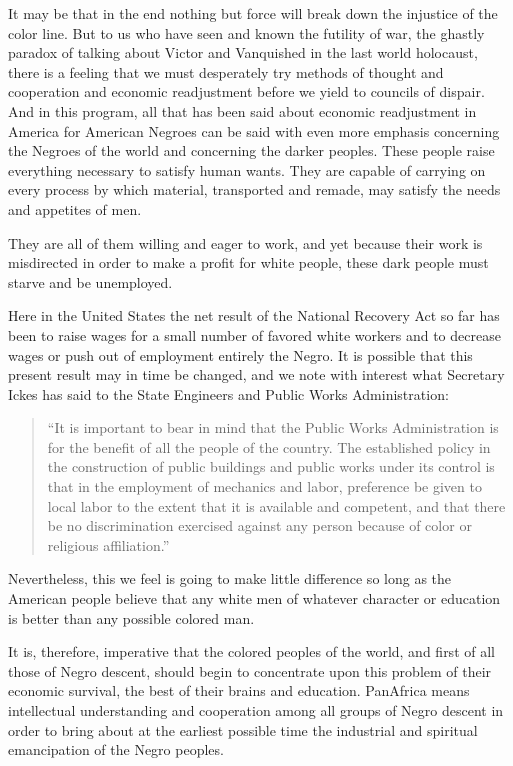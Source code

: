 \documentclass[letterpaper,10pt,english]{jupyterBook}
\begin{document}
\sphinxAtStartPar
It may be that in the end nothing but force will break down the injustice of the color line. But to us who have seen and known the futility of war, the ghastly paradox of talking about Victor and Vanquished in the last world holocaust, there is a feeling that we must desperately try methods of thought and co\sphinxhyphen{}operation and economic re\sphinxhyphen{}adjustment before we yield to councils of dispair. And in this program, all that has been said about economic readjustment in America for American Negroes can be said with even more emphasis concerning the Negroes of the world and concerning the darker peoples. These people raise everything necessary to satisfy human wants. They are capable of carrying on every process by which material, transported and re\sphinxhyphen{}made, may satisfy the needs and appetites of men.

\sphinxAtStartPar
They are all of them willing and eager to work, and yet because their work is misdirected in order to make a profit for white people, these dark people must starve and be unemployed.

\sphinxAtStartPar
Here in the United States the net result of the National Recovery Act so far has been to raise wages for a small number of favored white workers and to decrease wages or push out of employment entirely the Negro. It is possible that this present result may in time be changed, and we note with interest what Secretary Ickes has said to the State Engineers and Public Works Administration:
\begin{quote}

\sphinxAtStartPar
“It is important to bear in mind that the Public Works Administration is for the benefit of all the people of the country. The established policy in the construction of public buildings and public works under its control is that in the employment of mechanics and labor, preference be given to local labor to the extent that it is available and competent, and that there be no discrimination exercised against any person because of color or religious affiliation.”
\end{quote}

\sphinxAtStartPar
Nevertheless, this we feel is going to make little difference so long as the American people believe that any white men of whatever character or education is better than any possible colored man.

\sphinxAtStartPar
It is, therefore, imperative that the colored peoples of the world, and first of all those of Negro descent, should begin to concentrate upon this problem of their economic survival, the best of their brains and education. Pan\sphinxhyphen{}Africa means intellectual understanding and co\sphinxhyphen{}operation among all groups of Negro descent in order to bring about at the earliest possible time the industrial and spiritual emancipation of the Negro peoples.
\end{document}
